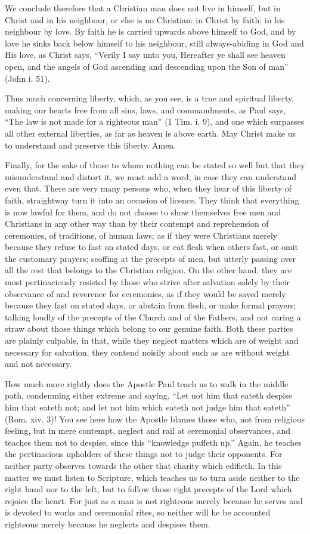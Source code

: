 We conclude therefore that a Christian man does not live in himself, but
in Christ and in his neighbour, or else is no Christian: in Christ by
faith; in his neighbour by love. By faith he is carried upwards above
himself to God, and by love he sinks back below himself to his neighbour,
still always-abiding in God and His love, as Christ says, ``Verily I say
unto you, Hereafter ye shall see heaven open, and the angels of God
ascending and descending upon the Son of man'' (John i. 51).

Thus much concerning liberty, which, as you see, is a true and spiritual
liberty, making our hearts free from all sins, laws, and commandments, as
Paul says, ``The law is not made for a righteous man'' (1 Tim. i. 9), and
one which surpasses all other external liberties, as far as heaven is
above earth. May Christ make us to understand and preserve this liberty.
Amen.

Finally, for the sake of those to whom nothing can be stated so well but
that they misunderstand and distort it, we must add a word, in case they
can understand even that. There are very many persons who, when they hear
of this liberty of faith, straightway turn it into an occasion of licence.
They think that everything is now lawful for them, and do not choose to
show themselves free men and Christians in any other way than by their
contempt and reprehension of ceremonies, of traditions, of human laws; as
if they were Christians merely because they refuse to fast on stated days,
or eat flesh when others fast, or omit the customary prayers; scoffing at
the precepts of men, but utterly passing over all the rest that belongs to
the Christian religion. On the other hand, they are most pertinaciously
resisted by those who strive after salvation solely by their observance of
and reverence for ceremonies, as if they would be saved merely because
they fast on stated days, or abstain from flesh, or make formal prayers;
talking loudly of the precepts of the Church and of the Fathers, and not
caring a straw about those things which belong to our genuine faith. Both
these parties are plainly culpable, in that, while they neglect matters
which are of weight and necessary for salvation, they contend noisily
about such as are without weight and not necessary.

How much more rightly does the Apostle Paul teach us to walk in the middle
path, condemning either extreme and saying, ``Let not him that eateth
despise him that eateth not; and let not him which eateth not judge him
that eateth'' (Rom. xiv. 3)! You see here how the Apostle blames those who,
not from religious feeling, but in mere contempt, neglect and rail at
ceremonial observances, and teaches them not to despise, since this
``knowledge puffeth up.'' Again, he teaches the pertinacious upholders of
these things not to judge their opponents. For neither party observes
towards the other that charity which edifieth. In this matter we must
listen to Scripture, which teaches us to turn aside neither to the right
hand nor to the left, but to follow those right precepts of the Lord which
rejoice the heart. For just as a man is not righteous merely because he
serves and is devoted to works and ceremonial rites, so neither will he be
accounted righteous merely because he neglects and despises them.

